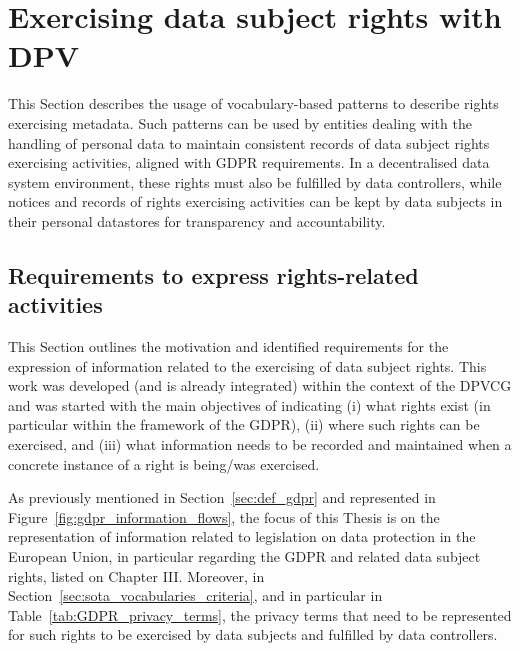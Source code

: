 \section{Exercising data subject rights with DPV}
\label{sec:rights_exercising}

This Section describes the usage of vocabulary-based patterns to describe rights exercising metadata.
Such patterns can be used by entities dealing with the handling of personal data to maintain consistent records of data subject rights exercising activities, aligned with GDPR requirements.
In a decentralised data system environment, these rights must also be fulfilled by data controllers, while notices and records of rights exercising activities can be kept by data subjects in their personal datastores for transparency and accountability.

\subsection{Requirements to express rights-related activities}
\label{sec:rights_concepts}

This Section outlines the motivation and identified requirements for the expression of information related to the exercising of data subject rights.
This work was developed (and is already integrated) within the context of the DPVCG and was started with the main objectives of indicating (i) what rights exist (in particular within the framework of the GDPR), (ii) where such rights can be exercised, and (iii) what information needs to be recorded and maintained when a concrete instance of a right is being/was exercised.

As previously mentioned in Section~\ref{sec:def_gdpr} and represented in Figure~\ref{fig:gdpr_information_flows}, the focus of this Thesis is on the representation of information related to legislation on data protection in the European Union, in particular regarding the GDPR and related data subject rights, listed on Chapter III.
Moreover, in Section~\ref{sec:sota_vocabularies_criteria}, and in particular in Table~\ref{tab:GDPR_privacy_terms}, the privacy terms that need to be represented for such rights to be exercised by data subjects and fulfilled by data controllers.

